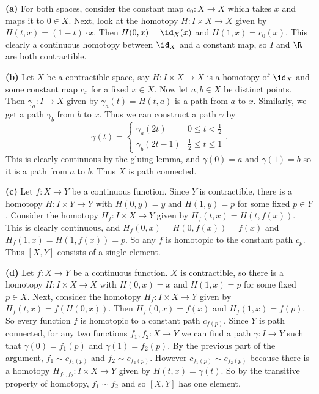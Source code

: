 \documentclass[11pt,letterpaper]{article}
\begin{document}
\begin{solution}
    \textbf{(a)} For both spaces, consider the constant map $c_0 : X \to X$ which takes $x$ and maps it to $0\in X$. Next, look at the homotopy $H : I\times X \to X$ given by $H(t,x) = (1-t)\cdot x$. Then $H(0,x)=\id_X(x)$ and $H(1,x)=c_0(x)$. This clearly a continuous homotopy between $\id_X$ and a constant map, so $I$ and $\R$ are both contractible.
    
    \textbf{(b)} Let $X$ be a contractible space, say $H : I\times X \to X$ is a homotopy of $\id_X$ and some constant map $c_x$ for a fixed $x\in X$. Now let $a,b\in X$ be distinct points. Then $\gamma_a : I \to X$ given by $\gamma_a(t)=H(t,a)$ is a path from $a$ to $x$. Similarly, we get a path $\gamma_b$ from $b$ to $x$. Thus we can construct a path $\gamma$ by
    \[
        \gamma(t)=\begin{cases}
            \gamma_a(2t)&0\leq t<\frac{1}{2}\\
            \gamma_b(2t-1)&\frac{1}{2}\leq t\leq 1
        \end{cases}
    .\]
    This is clearly continuous by the gluing lemma, and $\gamma(0)=a$ and $\gamma(1)=b$ so it is a path from $a$ to $b$. Thus $X$ is path connected.   
    
    \textbf{(c)} Let $f : X \to Y$ be a continuous function. Since $Y$ is contractible, there is a homotopy $H : I\times Y \to Y$ with $H(0,y)=y$ and $H(1,y)=p$ for some fixed $p\in Y$. Consider the homotopy $H_f : I\times X \to Y$ given by $H_f(t,x)=H(t,f(x))$. This is clearly continuous, and $H_f(0,x)=H(0,f(x))=f(x)$ and $H_f(1,x)=H(1,f(x))=p$. So any $f$ is homotopic to the constant path $c_p$. Thus $[X,Y]$ consists of a single element.
    
    \textbf{(d)} Let $f : X \to Y$ be a continuous function. $X$ is contractible, so there is a homotopy $H : I\times X \to X$ with $H(0,x)=x$ and $H(1,x)=p$ for some fixed $p\in X$. Next, consider the homotopy $H_f : I\times X \to Y$ given by $H_f(t,x)=f(H(0,x))$. Then $H_f(0,x)=f(x)$ and $H_f(1,x)=f(p)$. So every function $f$ is homotopic to a constant path $c_{f(p)}$. Since $Y$ is path connected, for any two functions $f_1, f_2 : X\to Y$ we can find a path $\gamma : I \to Y$ such that $\gamma(0)=f_1(p)$ and $\gamma(1)=f_2(p)$. By the previous part of the argument, $f_1\sim c_{f_1(p)}$ and $f_2\sim c_{f_2(p)}$. However $c_{f_1(p)}\sim c_{f_2(p)}$ because there is a homotopy $H_{f_1,f_2} : I\times X \to Y$ given by $H(t,x)=\gamma(t)$. So by the transitive property of homotopy, $f_1\sim f_2$ and so $[X,Y]$ has one element. 
\end{solution}
\end{document}
